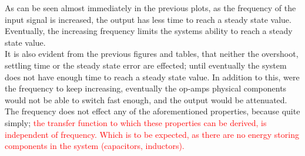 \documentclass[11pt,a4paper]{article}
\begin{document}
\begin{enumerate}
	
	As can be seen almost immediately in the previous plots, as the frequency of the input signal is increased, the output has less time to reach a steady state value. %
	Eventually, the increasing frequency limits the systems ability to reach a steady state value.\\
	
	It is also evident from the previous figures and tables, that neither the overshoot, settling time or the steady state error are effected; until eventually the system does not have enough time to reach a steady state value. In addition to this, were the frequency to keep increasing, eventually the op-amps physical components would not be able to switch fast enough, and the output would be attenuated.\\
	
	The frequency does not effect any of the aforementioned properties, because quite simply; \textcolor{red}{the transfer function to which these properties can be derived, is independent of frequency. Which is to be expected, as there are no energy storing components in the system (capacitors, inductors).} 


\end{enumerate}
\end{document}
